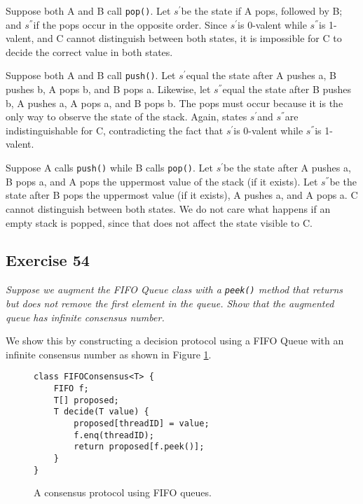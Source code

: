 \documentclass[a4paper,10pt]{article}
\newcommand{\Sp}{$s^{'}$}
\newcommand{\Spp}{$s^{''}$}
\begin{document}
Suppose both A and B call \lstinline|pop()|. Let \Sp be the state if A pops, followed by B; and \Spp if the pops occur in the opposite order. Since \Sp is 0-valent while \Spp is 1-valent, and C cannot distinguish between both states, it is impossible for C to decide the correct value in both states.

Suppose both A and B call \lstinline|push()|. Let \Sp equal the state after A pushes a, B pushes b, A pops b, and B pops a. Likewise, let \Spp equal the state after B pushes b, A pushes a, A pops a, and B pops b. The pops must occur because it is the only way to observe the state of the stack. Again, states \Sp and \Spp are indistinguishable for C, contradicting the fact that \Sp is 0-valent while \Spp is 1-valent.

Suppose A calls \lstinline|push()| while B calls \lstinline|pop()|. Let \Sp be the state after A pushes a, B pops a, and A pops the uppermost value of the stack (if it exists). Let \Spp be the state after B pops the uppermost value (if it exists), A pushes a, and A pops a. C cannot distinguish between both states. We do not care what happens if an empty stack is popped, since that does not affect the state visible to C.

\vspace{3mm}

\subsection{Exercise 54}

\emph{Suppose we augment the FIFO Queue class with a \lstinline|peek()| method
that returns but does not remove the first element in the queue. Show that the
augmented queue has infinite consensus number.}

\vspace{3mm}

We show this by constructing a decision protocol using a FIFO Queue with an infinite consensus number as shown in Figure \ref{fig:fifoconsensus}.

\begin{figure}
\begin{lstlisting}
class FIFOConsensus<T> {
    FIFO f;
    T[] proposed;
    T decide(T value) {
        proposed[threadID] = value;
        f.enq(threadID);
        return proposed[f.peek()];
    }
}
\end{lstlisting}
\caption{A consensus protocol using FIFO queues.}
\label{fig:fifoconsensus}
\end{figure}
\end{document}

